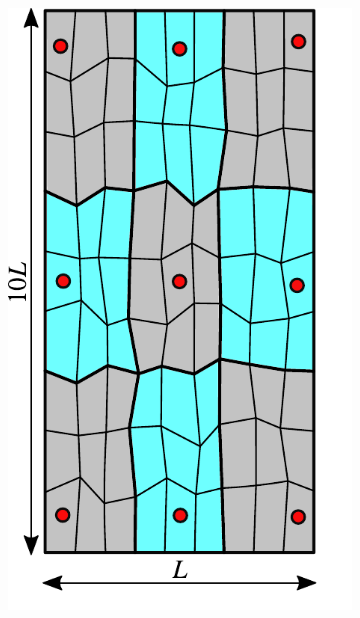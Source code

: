 \begin{figure} [htbp]
\begin{subfigure}[t]{0.22\textwidth}
  \centerline{\includegraphics[width=\linewidth]{figs/MPFA_9x9_a}}
  \caption{\label{fig:mpfa_demo_grid}}
\end{subfigure}
\hfill
\begin{subfigure}[t]{0.22\textwidth}

\end{subfigure}
\end{figure}
